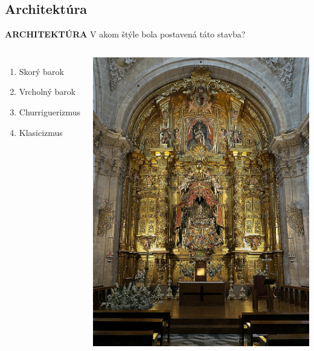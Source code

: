 \documentclass[dvipsnames]{beamer}
\begin{document}
\begin{frame}
	\subsection{Architektúra}
	\textbf{ARCHITEKTÚRA}
	\vskip 3mm
	V akom štýle bola postavená táto stavba?
	\begin{columns}
		\begin{enumerate}
			\item Skorý barok
			\item Vrcholný barok
			\item Churriguerizmus
			\item Klasicizmus
		\end{enumerate}
		\includegraphics[scale=0.2]{ultra}

	\end{columns}
\end{frame}
\end{document}

